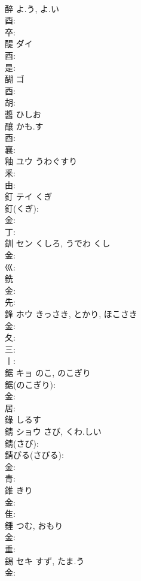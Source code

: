 \documentclass[8pt]{extreport}
\begin{document}
\begin{CJK}{UTF8}{min}
\\	醉		よ.う, よ.い				
\\	酉: 
\\	卒: 
\\	醍	ダイ			
\\	酉: 
\\	是: 
\\	醐	ゴ			
\\	酉: 
\\	胡: 
\\	醬		ひしお				
\\	釀		かも.す				
\\	酉: 
\\	襄: 
\\	釉	ユウ	うわぐすり		
\\	釆: 
\\	由: 
\\	釘	テイ	くぎ		
\\	釘(くぎ): 
\\	金: 
\\	丁: 
\\	釧	セン	くしろ, うでわ	くし	
\\	金: 
\\	巛: 
\\	銑					
\\	金: 
\\	先: 
\\	鋒	ホウ	きっさき, とかり, ほこさき		
\\	金: 
\\	夂: 
\\	三: 
\\	丨: 
\\	鋸	キョ	のこ, のこぎり		
\\	鋸(のこぎり): 
\\	金: 
\\	居: 
\\	錄		しるす				
\\	錆	ショウ	さび, くわ.しい		
\\	錆(さび): 
\\	錆びる(さびる): 
\\	金: 
\\	青: 
\\	錐		きり			
\\	金: 
\\	隹: 
\\	錘		つむ, おもり			
\\	金: 
\\	垂: 
\\	錫	セキ	すず, たま.う		
\\	金: 

\end{CJK}
\end{document}
